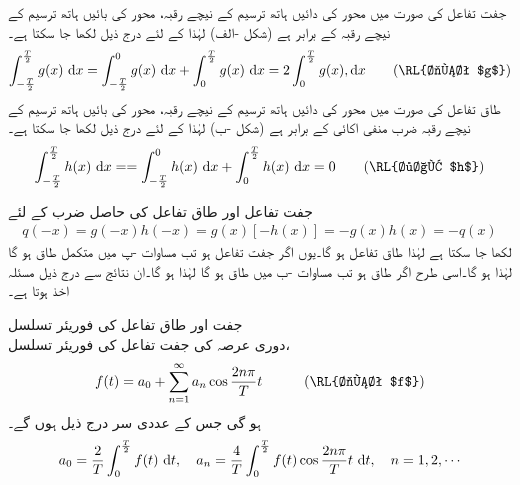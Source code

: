 جفت تفاعل  کی صورت میں  محور کی دائیں ہاتھ ترسیم کے نیچے رقبہ، محور کی بائیں ہاتھ ترسیم کے نیچے رقبہ کے  برابر ہے (شکل -الف) لہٰذا  کے لئے درج ذیل لکھا جا سکتا ہے۔
\begin{align}\label{مساوات_فوریئر_جفت_تفاعل_تکمل}
\int_{-\frac{T}{2}}^{\frac{T}{2}}g(x)\,\dif x=\int_{-\frac{T}{2}}^{0}g(x)\,\dif x+\int_{0}^{\frac{T}{2}}g(x)\,\dif x=2\int_{0}^{\frac{T}{2}}g(x),\dif x\quad \quad (\text{\RL{جفت $g$}})
\end{align}
طاق تفاعل  کی صورت میں  محور کی دائیں ہاتھ ترسیم کے نیچے رقبہ، محور کی بائیں ہاتھ ترسیم کے نیچے رقبہ ضرب منفی اکائی کے برابر ہے (شکل -ب) لہٰذا  کے لئے درج ذیل لکھا جا سکتا ہے۔
\begin{align}\label{مساوات_فوریئر_طاق_تفاعل_تکمل}
\int_{-\frac{T}{2}}^{\frac{T}{2}}h(x)\,\dif x==\int_{-\frac{T}{2}}^{0}h(x)\,\dif x+\int_{0}^{\frac{T}{2}}h(x)\,\dif x=0\quad \quad (\text{\RL{طاق $h$}})
\end{align}

جفت تفاعل  اور طاق تفاعل  کی حاصل ضرب  کے لئے
\begin{align*}
q(-x)=g(-x)h(-x)=g(x)[-h(x)]=-g(x)h(x)=-q(x)
\end{align*}
لکھا جا سکتا ہے لہٰذا   طاق تفاعل ہو گا۔یوں اگر  جفت تفاعل ہو تب مساوات -پ میں متکمل  طاق ہو گا لہٰذا  ہو گا۔اسی طرح اگر  طاق ہو تب مساوات -ب میں  طاق ہو گا لہٰذا  ہو گا۔ان نتائج سے درج ذیل مسئلہ اخذ ہوتا ہے۔

\quad جفت اور طاق تفاعل کی فوریئر تسلسل\\ 
دوری عرصہ  کی جفت تفاعل  کی فوریئر تسلسل، 
\begin{align}
f(t)=a_0+\sum_{n=1}^{\infty} a_n\cos \frac{2n\pi}{T}t\quad \quad \quad (\text{\RL{جفت $f$}})
\end{align}
 ہو گی جس کے عددی سر درج ذیل ہوں گے۔
\begin{align}
a_0=\frac{2}{T}\int_{0}^{\frac{T}{2}}f(t)\,\dif t, \quad a_n=\frac{4}{T}\int_{0}^{\frac{T}{2}}f(t)\cos \frac{2n\pi}{T}t\,\dif t,\quad n=1,2,\cdots
\end{align}
 
